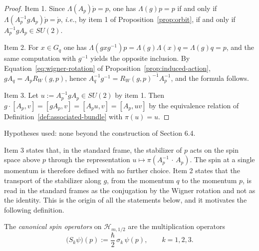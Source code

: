 \begin{proof}
	Item 1. Since $\Lambda(A_p)\mathring{p}=p$, one has $\Lambda(g)p=p$ if and only if $\Lambda(A_p^{-1}gA_p)\mathring{p}=\mathring{p}$, \textit{i.e.}, by item 1 of Proposition~\ref{prop:orbit}, if and only if $A_p^{-1}gA_p\in SU(2)$.
	
	Item 2. For $x\in G_q$ one has $\Lambda(gxg^{-1})p=\Lambda(g)\Lambda(x)q=\Lambda(g)q=p$, and the same computation with $g^{-1}$ yields the opposite inclusion. By Equation~\eqref{eq:wigner-rotation} of Proposition~\ref{prop:induced-action}, $gA_q=A_pR_W(g,p)$, hence $A_q^{-1}g^{-1}=R_W(g,p)^{-1}A_p^{-1}$, and the formula follows.
	
	Item 3. Let $u:=A_p^{-1}gA_p\in SU(2)$ by item 1. Then $g\cdot[A_p,v]=[gA_p,v]=[A_pu,v]=[A_p,uv]$ by the equivalence relation of Definition~\ref{def:associated-bundle} with $\pi(u)=u$.
\end{proof}

\noindent Hypotheses used: none beyond the construction of Section 6.4.

Item 3 states that, in the standard frame, the stabilizer of $p$ acts on the spin space above $p$ through the representation $u\mapsto\pi(A_p^{-1}\,\cdot\,A_p)$. The spin at a single momentum is therefore defined with no further choice. Item 2 states that the transport of the stabilizer along $g$, from the momentum $q$ to the momentum $p$, is read in the standard frames as the conjugation by the Wigner rotation and not as the identity. This is the origin of all the statements below, and it motivates the following definition.

\begin{definition}\label{def:canonical-spin}
	The \emph{canonical spin operators} on $\mathcal{H}_{m,1/2}$ are the multiplication operators
	\begin{equation*}
		\big(S_k\psi\big)(p):=\frac{\hbar}{2}\,\sigma_k\,\psi(p),\qquad k=1,2,3.
	\end{equation*}
\end{definition}

